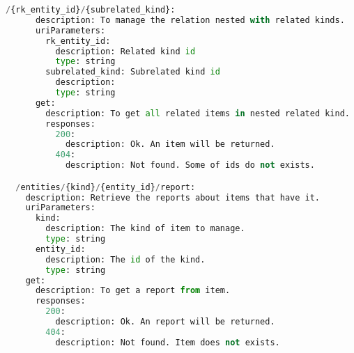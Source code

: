 \begin{lstlisting}[language=python,frame=none]
    /{rk_entity_id}/{subrelated_kind}:
      description: To manage the relation nested with related kinds.
      uriParameters:
        rk_entity_id:
          description: Related kind id
          type: string
        subrelated_kind: Subrelated kind id
          description:
          type: string
      get:
        description: To get all related items in nested related kind.
        responses:
          200:
            description: Ok. An item will be returned.
          404:
            description: Not found. Some of ids do not exists.

  /entities/{kind}/{entity_id}/report:
    description: Retrieve the reports about items that have it.
    uriParameters:
      kind:
        description: The kind of item to manage.
        type: string
      entity_id:
        description: The id of the kind.
        type: string
    get:
      description: To get a report from item.
      responses:
        200:
          description: Ok. An report will be returned.
        404:
          description: Not found. Item does not exists.
\end{lstlisting}



